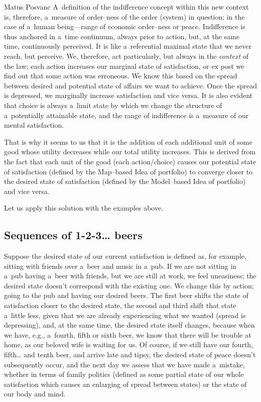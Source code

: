 \begin{artengenv}{Matus Posvanc}
A~definition of the indifference concept within this new context is, therefore, a~measure of order–ness of the order (system) in question; in the case of a~human being---range of economic order–ness or peace. Indifference is thus anchored in a~time continuum, always prior to action, but, at the same time, continuously perceived. It is like a~referential maximal state that we never reach, but perceive. We, therefore, act particularly, but always in the \textit{context} of the law; each action increases our marginal state of satisfaction, or ex post we find out that some action was erroneous. We know this based on the spread between desired and potential state of affairs we want to achieve. Once the spread is depressed, we marginally increase satisfaction and vice versa. It is also evident that choice is always a~limit state by which we change the structure of a~potentially attainable state, and the range of indifference is a~measure of our mental satisfaction.



That is why it seems to us that it is the addition of each additional unit of some good whose utility decreases while our total utility increases. This is derived from the fact that each unit of the good (each action/choice) causes our potential state of satisfaction (defined by the Map–based Idea of portfolio) to converge closer to the desired state of satisfaction (defined by the Model–based Idea of portfolio) and vice versa.



Let us apply this solution with the examples above.



\subsection*{Sequences of 1-2-3… beers }



Suppose the desired state of our current satisfaction is defined as, for example, sitting with friends over a~beer and music in a~pub. If we are not sitting in a~pub having a~beer with friends, but we are still at work, we feel uneasiness; the desired state doesn't correspond with the existing one. We change this by action; going to the pub and having our desired beers. The first beer shifts the state of satisfaction closer to the desired state, the second and third shift that state a~little less, given that we are already experiencing what we wanted (spread is depressing), and, at the same time, the desired state itself changes, because when we have, e.g., a~fourth, fifth or sixth beer, we know that there will be trouble at home, as our beloved wife is waiting for us. Of course, if we still have our fourth, fifth… and tenth beer, and arrive late and tipsy, the desired state of peace doesn't subsequently occur, and the next day we assess that we have made a~mistake, whether in terms of family politics (defined as some partial state of our whole satisfaction which causes an enlarging of spread between states) or the state of our body and mind.




\end{artengenv}
